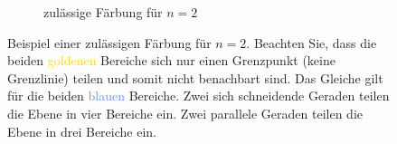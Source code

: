 \begin{myexercise}
\begin{figure}[H]
\begin{subfigure}{0.4\textwidth}
			\caption{zulässige Färbung für $n=2$}
			\label{subfig:2linesFilled}
		\end{subfigure}
		\caption{Beispiel einer zulässigen Färbung für $n=2$. Beachten Sie, dass die beiden \textcolor{Gold}{goldenen} Bereiche sich nur einen Grenzpunkt (keine Grenzlinie) teilen und somit nicht benachbart sind. Das Gleiche gilt für die beiden \textcolor{CornflowerBlue}{blauen} Bereiche. Zwei sich schneidende Geraden teilen die Ebene in vier Bereiche ein. Zwei parallele Geraden teilen die Ebene in drei Bereiche ein.}
		\label{fig:2lines}
	\end{figure}
\end{myexercise}


